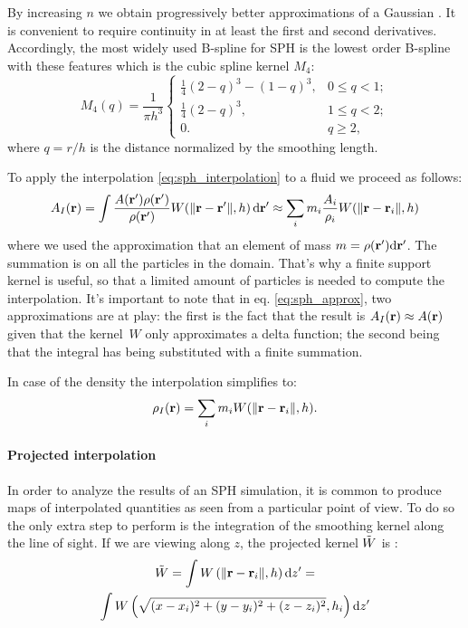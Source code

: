 By increasing $n$ we obtain progressively better approximations of a Gaussian \citep[see Section 13.3 of][]{Easton2010}.
It is convenient to require continuity in at least the first and second derivatives.
Accordingly, the most widely used B-spline for SPH is the lowest order B-spline with these features which is the cubic spline kernel $M_4$:
\begin{equation}
M_4(q) = \frac{1}{\pi h^3} \left\{
\begin{array}{ll}
\frac{1}{4}(2-q)^3 - (1 - q)^{3}, & 0 \le q < 1; \\[1ex]
\frac{1}{4}(2-q)^3, & 1 \le q < 2; \\[1ex]
0. & q \ge 2,
\end{array}
\right.
\label{eq:cubicspline}
\end{equation}
where $q=r/h$ is the distance normalized by the smoothing length.

To apply the interpolation \eqref{eq:sph_interpolation} to a fluid we proceed as follows:
\begin{equation}
A_I(\boldsymbol{\mathbf{r}}) = \int \frac{A(\boldsymbol{\mathbf{r}}')\rho(\boldsymbol{\mathbf{r}}')}{\rho(\boldsymbol{\mathbf{r}}')} W(\norm{\boldsymbol{\mathbf{r}} - \boldsymbol{\mathbf{r}}'},h)\, \dd\boldsymbol{\mathbf{r}}' \approx
\sum_i m_i\frac{A_i}{\rho_i} W(\norm{\boldsymbol{\mathbf{r}} - \boldsymbol{\mathbf{r}}_i},h)
\label{eq:sph_approx}
\end{equation}
where we used the approximation that an element of mass $m = \rho(\boldsymbol{\mathbf{r}}') \dd\boldsymbol{\mathbf{r}}'$.
The summation is on all the particles in the domain.
That's why a finite support kernel is useful, so that a limited amount of particles is needed to compute the interpolation.
It's important to note that in eq. \eqref{eq:sph_approx}, two approximations are at play:
the first is the fact that the result is $A_I(\boldsymbol{\mathbf{r}}) \approx A(\boldsymbol{\mathbf{r}})$ given that the kernel~$W$ only approximates a delta function; the second being that the integral has being substituted with a finite summation.

In case of the density the interpolation simplifies to:
\begin{equation}
  \rho_I(\boldsymbol{\mathbf{r}}) = \sum_i m_i W(\norm{\boldsymbol{\mathbf{r}} - \boldsymbol{\mathbf{r}}_i},h).
\end{equation}

\paragraph{Projected interpolation}
In order to analyze the results of an SPH simulation, it is common to produce maps of interpolated quantities as seen from a particular point of view.
To do so the only extra step to perform is the integration of the smoothing kernel along the line of sight.
If we are viewing along $z$, the projected kernel $\Tilde W$ is :
\begin{multline}
  \tilde W  = \int W \left(\norm{\vect{r} - \vect{r}_i},h \right) \dd z' =\\
   \int W \left(\sqrt{(x-x_i)^2+(y-y_i)^2+(z-z_i)^2}, h_i \right) \dd z' %
\label{eq:projected_kernel}
\end{multline}


